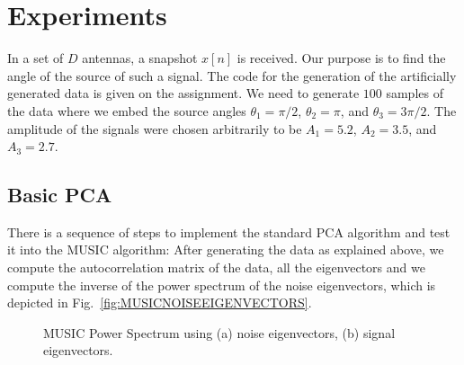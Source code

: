 \documentclass[letterpaper, 10 pt, conference]{ieeeconf}  %
\begin{document}


\section{Experiments}
\label{sec:Experiments}

In a set of $D$ antennas, a snapshot $x[n]$ is received. Our purpose is to find the angle of the source of such a signal. The code for the generation of 
the artificially generated data is given on the assignment. We need to generate $100$ samples of the data where we embed the source angles 
$\theta_{1} = \pi/2$,  $\theta_{2} = \pi$, and $\theta_{3} = 3\pi/2$. The amplitude of the signals were chosen arbitrarily to be $A_{1} = 5.2$,  $A_{2} = 3.5$, 
and $A_{3} = 2.7$.

\subsection{Basic PCA}
\label{sec:ExperimentsBasicPCA}

There is a sequence of steps to implement the standard PCA algorithm and test it into the MUSIC algorithm: After generating the data as explained above, 
we compute the autocorrelation matrix of the data, all the eigenvectors and we compute the inverse of the power spectrum of the noise eigenvectors, which is
depicted in Fig.~\ref{fig:MUSICNOISEEIGENVECTORS}.

\begin{figure}[ht!]
 \begin{center}
         \caption{MUSIC Power Spectrum using  (a) noise eigenvectors, (b) signal eigenvectors. }
 \label{fig:PowerSpectrum}
 \end{center}
\end{figure}
\end{document}
